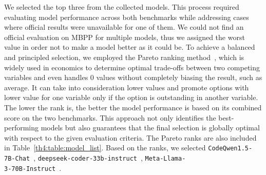 We selected the top three from the collected models.
This process required evaluating model performance across both benchmarks while addressing cases where official results were unavailable for one of them.
We could not find an official evaluation on MBPP for multiple models, thus we assigned the worst value in order not to make a model better as it could be.
To achieve a balanced and principled selection, we employed the Pareto ranking method~\cite{pareto_usage}, which is widely used in economics to determine optimal trade-offs between two competing variables and even handles 0 values without completely biasing the result, such as average.
It can take into consideration lower values and promote options with lower value for one variable only if the option is outstanding in another variable.
The lower the rank is, the better the model performance is based on its combined score on the two benchmarks.
This approach not only identifies the best-performing models but also guarantees that the final selection is globally optimal with respect to the given evaluation criteria.
The Pareto ranks are also included in Table~\ref{th4:table:model_list}.
Based on the ranks, we selected \texttt{CodeQwen1.5-7B-Chat}~\cite{CodeQwen1.5-7B-Chat}, \texttt{deepseek-coder-33b-instruct}~\cite{deepseek-coder-33b-instruct}, \texttt{Meta-Llama-\\3-70B-Instruct}~\cite{Meta-Llama-3-70B-Instruct}.

